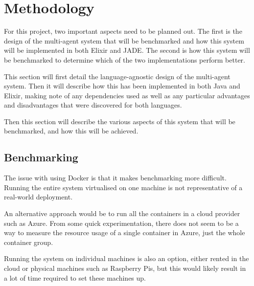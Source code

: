 \section{Methodology}

For this project, two important aspects need to be planned out.
The first is the design of the multi-agent system that will be benchmarked and how this system will be implemented in both Elixir and JADE\@.
The second is how this system will be benchmarked to determine which of the two implementations perform better.

This section will first detail the language-agnostic design of the multi-agent system.
Then it will describe how this has been implemented in both Java and Elixir, making note of any dependencies used as well as any particular advantages and disadvantages that were discovered for both languages.

Then this section will describe the various aspects of this system that will be benchmarked, and how this will be achieved.



\subsection{Benchmarking}

The issue with using Docker is that it makes benchmarking more difficult.
Running the entire system virtualised on one machine is not representative of a real-world deployment.

An alternative approach would be to run all the containers in a cloud provider such as Azure.
From some quick experimentation, there does not seem to be a way to measure the resource usage of a single container in Azure, just the whole container group.

Running the system on individual machines is also an option, either rented in the cloud or physical machines such as Raspberry Pis, but this would likely result in a lot of time required to set these machines up.
